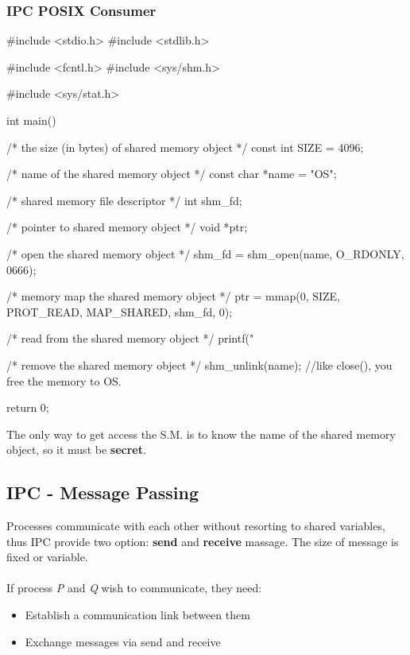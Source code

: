 \newpage
\subsubsection{IPC POSIX Consumer}
\begin{codeInC}
#include <stdio.h>
#include <stdlib.h>

#include <fcntl.h>
#include <sys/shm.h>

#include <sys/stat.h>

int main() {

    /* the size (in bytes) of shared memory object */
    const int SIZE = 4096;
    
    /* name of the shared memory object */
    const char *name = "OS";
    
    /* shared memory file descriptor */
    int shm_fd;
    
    /* pointer to shared memory object */
    void *ptr;
    
    /* open the shared memory object */
    shm_fd = shm_open(name, O_RDONLY, 0666);
    
    /* memory map the shared memory object */
    ptr = mmap(0, SIZE, PROT_READ, MAP_SHARED, shm_fd, 0);
    
    /* read from the shared memory object */
    printf("%
    
    /* remove the shared memory object */
    shm_unlink(name);  //like close(), you free the memory to OS.
    
    return 0;
}

\end{codeInC}


The only way to get access the S.M. is to know the name of the shared memory object, so it must be \textbf{secret}.

\newpage
 \subsection{IPC - Message Passing}
 Processes communicate with each other without resorting to shared variables, thus IPC provide two option: \textbf{send} and \textbf{receive} massage. The size of message is fixed or variable.

 \paragraph{}
 If process \textit{P} and \textit{Q} wish to communicate, they need:
 \begin{itemize}
     \item Establish a communication link between them
     \item Exchange messages via send and receive
 \end{itemize}
 
